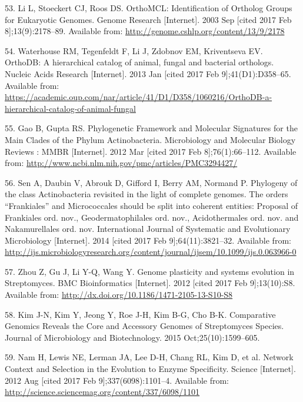 \documentclass[12pt,twoside]{reedthesis}
\begin{document}
  \hypertarget{ref-li_orthomcl_2003}{}
  53. Li L, Stoeckert CJ, Roos DS. OrthoMCL: Identification of Ortholog
  Groups for Eukaryotic Genomes. Genome Research {[}Internet{]}. 2003 Sep
  {[}cited 2017 Feb 8{]};13(9):2178--89. Available from:
  \url{http://genome.cshlp.org/content/13/9/2178}
  
  \hypertarget{ref-waterhouse_orthodb_2013}{}
  54. Waterhouse RM, Tegenfeldt F, Li J, Zdobnov EM, Kriventseva EV.
  OrthoDB: A hierarchical catalog of animal, fungal and bacterial
  orthologs. Nucleic Acids Research {[}Internet{]}. 2013 Jan {[}cited 2017
  Feb 9{]};41(D1):D358--65. Available from:
  \url{https://academic.oup.com/nar/article/41/D1/D358/1060216/OrthoDB-a-hierarchical-catalog-of-animal-fungal}
  
  \hypertarget{ref-gao_phylogenetic_2012}{}
  55. Gao B, Gupta RS. Phylogenetic Framework and Molecular Signatures for
  the Main Clades of the Phylum Actinobacteria. Microbiology and Molecular
  Biology Reviews : MMBR {[}Internet{]}. 2012 Mar {[}cited 2017 Feb
  8{]};76(1):66--112. Available from:
  \url{http://www.ncbi.nlm.nih.gov/pmc/articles/PMC3294427/}
  
  \hypertarget{ref-sen_phylogeny_2014}{}
  56. Sen A, Daubin V, Abrouk D, Gifford I, Berry AM, Normand P. Phylogeny
  of the class Actinobacteria revisited in the light of complete genomes.
  The orders ``Frankiales'' and Micrococcales should be split into
  coherent entities: Proposal of Frankiales ord. nov., Geodermatophilales
  ord. nov., Acidothermales ord. nov. and Nakamurellales ord. nov.
  International Journal of Systematic and Evolutionary Microbiology
  {[}Internet{]}. 2014 {[}cited 2017 Feb 9{]};64(11):3821--32. Available
  from:
  \url{http://ijs.microbiologyresearch.org/content/journal/ijsem/10.1099/ijs.0.063966-0}
  
  \hypertarget{ref-zhou_genome_2012}{}
  57. Zhou Z, Gu J, Li Y-Q, Wang Y. Genome plasticity and systems
  evolution in Streptomyces. BMC Bioinformatics {[}Internet{]}. 2012
  {[}cited 2017 Feb 9{]};13(10):S8. Available from:
  \url{http://dx.doi.org/10.1186/1471-2105-13-S10-S8}
  
  \hypertarget{ref-kim_comparative_2015}{}
  58. Kim J-N, Kim Y, Jeong Y, Roe J-H, Kim B-G, Cho B-K. Comparative
  Genomics Reveals the Core and Accessory Genomes of Streptomyces Species.
  Journal of Microbiology and Biotechnology. 2015 Oct;25(10):1599--605.
  
  \hypertarget{ref-nam_network_2012}{}
  59. Nam H, Lewis NE, Lerman JA, Lee D-H, Chang RL, Kim D, et al. Network
  Context and Selection in the Evolution to Enzyme Specificity. Science
  {[}Internet{]}. 2012 Aug {[}cited 2017 Feb 9{]};337(6098):1101--4.
  Available from:
  \url{http://science.sciencemag.org/content/337/6098/1101}
  
\end{document}
